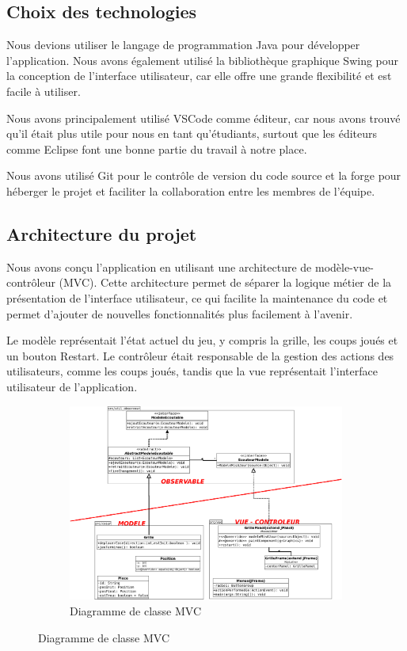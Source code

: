 \documentclass[a4paper,10pt]{article}
\begin{document}
\subsection{Choix des technologies}
Nous devions utiliser le langage de programmation Java pour développer l'application. Nous avons également utilisé la bibliothèque graphique Swing pour la conception de l'interface utilisateur, car elle offre une grande flexibilité et est facile à utiliser.

Nous avons principalement utilisé VSCode comme éditeur, car nous avons trouvé qu'il était plus utile pour nous en tant qu'étudiants, surtout que les éditeurs comme Eclipse font une bonne partie du travail à notre place.

Nous avons utilisé Git pour le contrôle de version du code source et la forge pour héberger le
projet et faciliter la collaboration entre les membres de l'équipe.

\subsection{Architecture du projet}

Nous avons conçu l'application en utilisant une architecture de modèle-vue-contrôleur (MVC).
Cette architecture permet de séparer la logique métier de la présentation de l'interface
utilisateur, ce qui facilite la maintenance du code et permet d'ajouter de nouvelles
fonctionnalités plus facilement à l'avenir.

Le modèle représentait l'état actuel du jeu, y compris la grille, les coups joués et un bouton
Restart.
 Le contrôleur était responsable de la gestion des actions des utilisateurs, comme les coups joués, tandis que la vue représentait l'interface utilisateur de l'application.

\begin{figure}[H]
\begin{subfigure}{1.2\textwidth}
  \centering
  \includegraphics[width=\linewidth]{captures/Dia.png}
  \caption{Diagramme de classe MVC}
\end{subfigure}

\end{figure}
\end{document}
